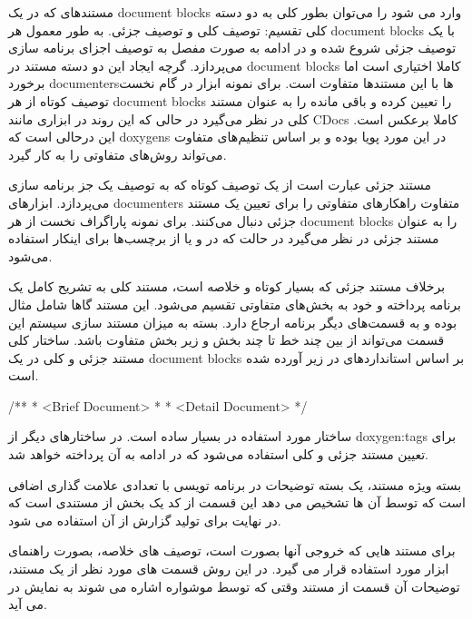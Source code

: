  مستندهای که در یک  \glspl{document block} وارد می شود را می‌توان بطور کلی به دو
دسته کلی تقسیم: توصیف کلی و توصیف جزئی. به طور معمول هر \glspl{document block}
با یک توصیف جزئی شروع شده و در ادامه به صورت مفصل به توصیف اجزای برنامه سازی
می‌پردازد. گرچه ایجاد این دو دسته مستند در \glspl{document block} کاملا اختیاری
است اما برخورد \glspl{documenter}ها با این مستندها متفاوت است. برای نمونه ابزار
 در گام نخست توصیف کوتاه از هر \glspl{document block} را تعیین کرده
و باقی مانده را به عنوان مستند کلی در نظر می‌گیرد در حالی که این روند در ابزاری
مانند \glspl{CDoc} کاملا برعکس است. این درحالی است که \glspl{doxygen} در این
مورد پویا بوده و بر اساس تنظیم‌های متفاوت می‌تواند روش‌های متفاوتی را به کار
گیرد. 

مستند جزئی عبارت است از یک توصیف کوتاه که به توصیف یک جز برنامه سازی می‌پردازد.
ابزارهای \glspl{documenter} متفاوت راهکارهای متفاوتی را برای تعیین یک مستند جزئی
دنبال می‌کنند. برای نمونه  پاراگراف نخست از هر \glspl{document
block} را به عنوان مستند جزئی در نظر می‌گیرد در حالت که در  و یا
 از برچسب‌ها برای اینکار استفاده می‌شود.

برخلاف مستند جزئی که بسیار کوتاه و خلاصه است، مستند کلی به تشریح کامل یک برنامه
پرداخته و خود به بخش‌های متفاوتی تقسیم می‌شود. این مستند گاها شامل مثال بوده و
به قسمت‌های دیگر برنامه ارجاع دارد. بسته به میزان مستند سازی سیستم این قسمت
می‌تواند از بین چند خط تا چند بخش و زیر بخش متفاوت باشد. ساختار کلی مستند جزئی و
کلی در یک \glspl{document block} بر اساس استانداردهای  در زیر آورده
شده است.

\begin{Java}
/**
 * <Brief Document>
 *
 * <Detail Document>
 */
\end{Java}

ساختار مورد استفاده در  بسیار ساده است. در ساختارهای دیگر از
\glspl{doxygen:tag} برای تعیین مستند جزئی و کلی استفاده می‌شود که در ادامه به آن
پرداخته خواهد شد.

بسته ویژه مستند، یک بسته توضیحات در برنامه تویسی  با تعدادی علامت
گذاری اضافی است که  توسط آن ها تشخیص می دهد این قسمت از کد یک بخش از
مستندی است که در نهایت برای تولید گزارش از آن استفاده می شود.

برای مستند هایی که  خروجی آنها بصورت  است، توصیف های خلاصه، بصورت
راهنمای ابزار   مورد استفاده قرار می گیرد. در این روش قسمت های
مورد نظر از یک مستند، توضیحات آن قسمت از مستند وقتی که توسط موشواره اشاره می
شوند به نمایش در می آید.


